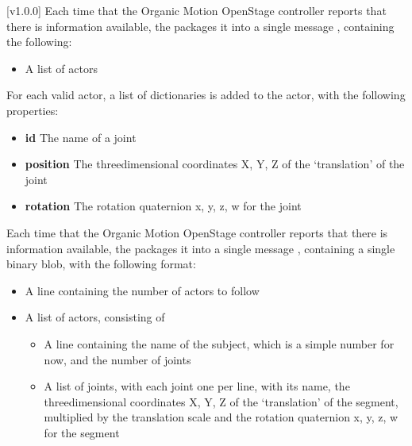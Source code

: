 [v1.0.0]
Each time that the Organic Motion OpenStage controller reports that there is information
available, the  packages it into a single message
\openSq{}\closeSq, containing the following:
\begin{itemize}
\item A list of actors
\end{itemize}

For each valid actor, a list of dictionaries is added to the actor, with the following
properties:
\begin{itemize}
\item\textbf{id} The name of a joint
\item\exSp\textbf{position} The three\longDash{}dimensional coordinates \openSq{}X, Y,
Z\closeSq{} of the `translation' of the joint
\item\exSp\textbf{rotation} The rotation quaternion \openSq{}x, y, z, w\closeSq{} for the
joint
\end{itemize}
\primaryEnd{}
Each time that the Organic Motion OpenStage controller reports that there is information
available, the  packages it into a single message
\openSq{}\closeSq, containing a single binary blob, with the following
format:
\begin{itemize}
\item A line containing the number of actors to follow
\item\exSp{}A list of actors, consisting of
\begin{itemize}
\item A line containing the name of the subject, which is a simple number for now, and the
number of joints
\item\exSp{}A list of joints, with each joint one per line, with its name, the
three\longDash{}dimensional coordinates \openSq{}X, Y, Z\closeSq{} of the `translation'
of the segment, multiplied by the translation scale and the rotation quaternion
\openSq{}x, y, z, w\closeSq{} for the segment
\end{itemize}
\end{itemize}
\primaryEnd{}
